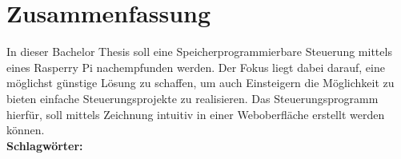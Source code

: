 \thispagestyle{empty}
\section*{Zusammenfassung}
In dieser Bachelor Thesis soll eine Speicherprogrammierbare Steuerung mittels eines Rasperry Pi nachempfunden werden. Der Fokus liegt dabei darauf, eine möglichst günstige Lösung zu schaffen, um auch Einsteigern die Möglichkeit zu bieten einfache Steuerungsprojekte zu realisieren. Das Steuerungsprogramm hierfür, soll mittels Zeichnung intuitiv in einer Weboberfläche erstellt werden können.
\\[0.5cm]
\textbf{Schlagwörter:} \keywords
